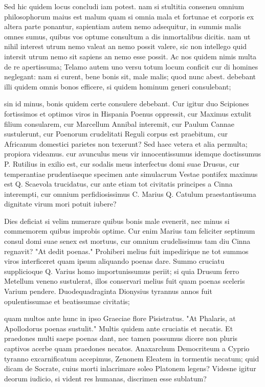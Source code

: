  Sed hic quidem locus concludi iam potest. nam si stultitia consensu omnium philosophorum maius est malum quam si omnia mala et fortunae et corporis ex altera parte ponantur, sapientiam autem nemo adsequitur, in summis malis omnes sumus, quibus vos optume consultum a dis inmortalibus dicitis. nam ut nihil interest utrum nemo valeat an nemo possit valere, sic non intellego quid intersit utrum nemo sit sapiens an nemo esse possit. Ac nos quidem nimis multa de re apertissuma; Telamo autem uno versu totum locum conficit cur di homines neglegant: nam si curent, bene bonis sit, male malis; quod nunc abest. debebant illi quidem omnis bonos efficere, si quidem hominum generi consulebant;

 sin id minus, bonis quidem certe consulere debebant. Cur igitur duo Scipiones fortissimos et optimos viros in Hispania Poenus oppressit, cur Maximus extulit filium consularem, cur Marcellum Annibal interemit, cur Paulum Cannae sustulerunt, cur Poenorum crudelitati Reguli corpus est praebitum, cur Africanum domestici parietes non texerunt? Sed haec vetera et alia permulta; propiora videamus. cur avunculus meus vir innocentissumus idemque doctissumus P. Rutilius in exilio est, cur sodalis meus interfectus domi suae Drusus, cur temperantiae prudentiaeque specimen ante simulacrum Vestae pontifex maximus est Q. Scaevola trucidatus, cur ante etiam tot civitatis principes a Cinna interempti, cur omnium perfidiosissimus C. Marius Q. Catulum praestantissuma dignitate virum mori potuit iubere?

 Dies deficiat si velim numerare quibus bonis male evenerit, nec minus si commemorem quibus improbis optime. Cur enim Marius tam feliciter septimum consul domi suae senex est mortuus, cur omnium crudelissimus tam diu Cinna regnavit? "At dedit poenas." Prohiberi melius fuit impedirique ne tot summos viros interficeret quam ipsum aliquando poenas dare. Summo cruciatu supplicioque Q. Varius homo importunissumus periit; si quia Drusum ferro Metellum veneno sustulerat, illos conservari melius fuit quam poenas sceleris Varium pendere. Duodequadraginta Dionysius tyrannus annos fuit opulentissumae et beatissumae civitatis;

 quam multos ante hunc in ipso Graeciae flore Pisistratus. "At Phalaris, at Apollodorus poenas sustulit." Multis quidem ante cruciatis et necatis. Et praedones multi saepe poenas dant, nec tamen possumus dicere non pluris captivos acerbe quam praedones necatos. Anaxarchum Democriteum a Cyprio tyranno excarnificatum accepimus, Zenonem Eleatem in tormentis necatum; quid dicam de Socrate, cuius morti inlacrimare soleo Platonem legens? Videsne igitur deorum iudicio, si vident res humanas, discrimen esse sublatum?

